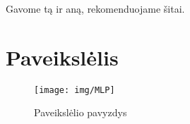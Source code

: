 \documentclass{VUMIFInfKursinis}
\begin{document}
Gavome tą ir aną, rekomenduojame šitai.

\printbibliography[heading=bibintoc] %

\appendix  %

\section{Paveikslėlis}
\begin{figure}[H]
    \centering
    \texttt{[image: img/MLP]}
    \caption{Paveikslėlio pavyzdys}   %
    \label{img:mlp}
\end{figure}
\end{document}
